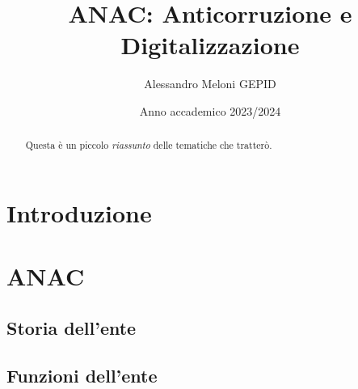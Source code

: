 \documentclass{article}
\title{ANAC: Anticorruzione e Digitalizzazione}
\author{Alessandro Meloni GEPID}
\date{Anno accademico 2023/2024}
\begin{document}
\maketitle
\begin{abstract}
    Questa è un piccolo \textit{riassunto} delle tematiche che tratterò.
\end{abstract}

\centering \tableofcontents
\newpage\centering
\section{Introduzione}
\flushleft 

\newpage\centering
\section{ANAC}
\flushleft

\flushleft \subsection{Storia dell'ente}

\flushleft \subsection{Funzioni dell'ente}
\end{document}
